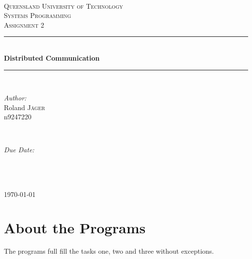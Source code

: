 \documentclass[english,a4paper,12pt]{scrartcl}
\newcommand{\HRule}{\rule{\linewidth}{0.5mm}} %
\begin{document}
\begin{titlepage}
  \center %

  ~\\[2cm]
  \textsc{\LARGE Queensland University of Technology}\\[1.5cm] %
  \textsc{\Large Systems Programming}\\[0.5cm] %
  \textsc{\large Assignment 2}\\[2cm] %

  \HRule \\[1cm]
  {
    \huge \bfseries Distributed Communication
  }\\[0.5cm] %
  \HRule \\[1.5cm]

  \begin{minipage}{0.4\textwidth}
    \begin{flushleft} \large
      \emph{Author:}\\
      Roland  \textsc{Jäger} \\%
      \small n9247220
    \end{flushleft}
  \end{minipage}
  ~
  \begin{minipage}{0.4\textwidth}
    \begin{flushright} \large
      \emph{Due Date:} \\
      \shortdate{}\\~
    \end{flushright}
  \end{minipage}\\[4cm]

  \vspace*{\fill}
  {
    \large \today
  }
\end{titlepage}

\section{About the Programs}
  The programs full fill the tasks one, two and three without exceptions.
\end{document}
